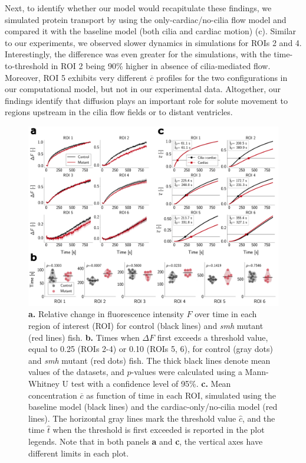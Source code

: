 \documentclass[fleqn]{wlscirep}
\newcommand{\cbar}{\overline{c}}
\begin{document}
Next, to identify whether our model would recapitulate these findings,
we simulated protein transport by using the only-cardiac/no-cilia flow model 
and compared it with the baseline model (both cilia and cardiac motion) (c).
Similar to our experiments, we observed slower dynamics in simulations for ROIs 2 and 4.
Interestingly, the difference was even greater for the simulations,
with the time-to-threshold in ROI 2 being 90\% higher in absence of cilia-mediated flow.
Moreover, ROI 5 exhibits very different $\cbar$ profiles for the two configurations in our computational model,
but not in our experimental data.
Altogether, our findings identify that diffusion plays an important role for solute movement to regions upstream in the cilia flow fields or to distant ventricles.
\begin{figure}[H]
    \centering
    \includegraphics[width=\textwidth]{graphics/figure4_compare_control_mutant.png}
    \caption{\textbf{a.} Relative change in fluorescence intensity $F$ over time in each region of interest (ROI) for control (black lines) and \emph{smh} mutant (red lines) fish. 
    \textbf{b.} Times when $\Delta F$ first exceeds a threshold value, equal to 0.25 (ROIs 2-4) or 0.10 (ROIs 5, 6), for control (gray dots) and \emph{smh} mutant (red dots) fish.
    The thick black lines denote mean values of the datasets, and $p$-values were calculated using a Mann-Whitney U test with a confidence level of 95\%.
    \textbf{c.} Mean concentration $\cbar$ as function of time in each ROI, simulated using the baseline model (black lines) and the cardiac-only/no-cilia model (red lines).
    The horizontal gray lines mark the threshold value $\hat{c}$, and the time $\hat{t}$ when the threshold is first exceeded is reported in the plot legends.
    Note that in both panels \textbf{a} and \textbf{c}, the vertical axes have different limits in each plot.}
    \label{fig:figure4_compare_control_mutant}
\end{figure}
\end{document}
